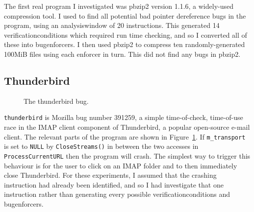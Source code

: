 The first real program I investigated was pbzip2 version 1.1.6, a
widely-used compression tool.  I used {\implementation} to find all
potential bad pointer dereference bugs in the program, using an
\gls{analysiswindow} of 20 instructions.  This generated 14
\glspl{verificationcondition} which required run time checking, and so
I converted all of these into \glspl{bugenforcer}.  I then used pbzip2
to compress ten randomly-generated 100MiB files using each enforcer in
turn.  This did not find any bugs in pbzip2.

\subsection{Thunderbird}

\begin{figure}
  \caption{The thunderbird bug.}
  \label{fig:eval:thunderbird}
\end{figure}

\verb|thunderbird| is Mozilla bug number 391259\cite{Mery2007}, a
simple time-of-check, time-of-use race in the IMAP client component of
Thunderbird, a popular open-source e-mail client.  The relevant parts
of the program are shown in Figure~\ref{fig:eval:thunderbird}.  If
\verb|m_transport| is set to \verb|NULL| by \verb|CloseStreams()| in
between the two accesses in \verb|ProcessCurrentURL| then the program
will crash.  The simplest way to trigger this behaviour is for the
user to click on an IMAP folder and to then immediately close
Thunderbird.  For these experiments, I assumed that the crashing
instruction had already been identified, and so I had
{\implementation} investigate that one instruction rather than
generating every possible \glspl{verificationcondition} and
\glspl{bugenforcer}.

